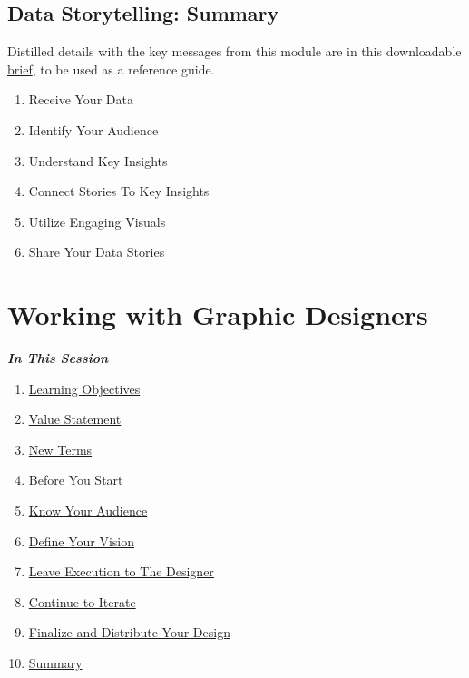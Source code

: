 \documentclass[
]{book}
\providecommand{\tightlist}{%
  \setlength{\itemsep}{0pt}\setlength{\parskip}{0pt}}
\begin{document}
\hypertarget{data-storytelling-summary}{%
\subsection{Data Storytelling: Summary}\label{data-storytelling-summary}}

Distilled details with the key messages from this module are in this downloadable \href{files/M4S2_Data_Storytelling_Brief.pdf}{brief}, to be used as a reference guide.

\begin{enumerate}
\def\labelenumi{\arabic{enumi}.}
\tightlist
\item
  Receive Your Data
\item
  Identify Your Audience
\item
  Understand Key Insights
\item
  Connect Stories To Key Insights
\item
  Utilize Engaging Visuals
\item
  Share Your Data Stories
\end{enumerate}

\hypertarget{working-with-graphic-designers}{%
\section{Working with Graphic Designers}\label{working-with-graphic-designers}}

\textbf{\emph{In This Session }}

\begin{enumerate}
\def\labelenumi{\arabic{enumi}.}
\tightlist
\item
  \protect\hyperlink{working-with-graphic-designers-learning-objectives}{Learning Objectives}
\item
  \protect\hyperlink{working-with-graphic-designers-value-statement}{Value Statement}
\item
  \protect\hyperlink{working-with-graphic-designers-new-terms}{New Terms}
\item
  \protect\hyperlink{before-you-start}{Before You Start}
\item
  \protect\hyperlink{know-your-audience}{Know Your Audience}
\item
  \protect\hyperlink{define-your-vision}{Define Your Vision}
\item
  \protect\hyperlink{leave-execution-to-the-designer}{Leave Execution to The Designer}
\item
  \protect\hyperlink{continue-to-iterate}{Continue to Iterate}
\item
  \protect\hyperlink{finalize-and-distribute-your-design}{Finalize and Distribute Your Design}
\item
  \protect\hyperlink{working-with-graphic-designers-summary}{Summary}
\end{enumerate}
\end{document}
